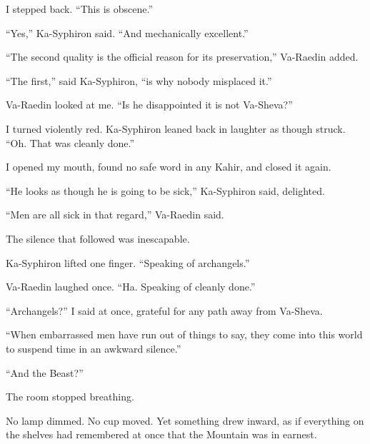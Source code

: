 I stepped back. ``This is obscene.''\par

``Yes,'' Ka-Syphiron said. ``And mechanically excellent.''\par

``The second quality is the official reason for its preservation,'' Va-Raedin added.\par

``The first,'' said Ka-Syphiron, ``is why nobody misplaced it.''\par

Va-Raedin looked at me. ``Is he disappointed it is not Va-Sheva?''\par

I turned violently red. Ka-Syphiron leaned back in laughter as though struck. ``Oh. That was cleanly done.''\par

I opened my mouth, found no safe word in any Kahir, and closed it again.\par

``He looks as though he is going to be sick,'' Ka-Syphiron said, delighted.\par

``Men are all sick in that regard,'' Va-Raedin said.\par

The silence that followed was inescapable.\par

Ka-Syphiron lifted one finger. ``Speaking of archangels.''\par

Va-Raedin laughed once. ``Ha. Speaking of cleanly done.''\par

``Archangels?'' I said at once, grateful for any path away from Va-Sheva.\par

``When embarrassed men have run out of things to say, they come into this world to suspend time in an awkward silence.''\par

``And the Beast?''\par

The room stopped breathing.\par

No lamp dimmed. No cup moved. Yet something drew inward, as if everything on the shelves had remembered at once that the Mountain was in earnest.\par

